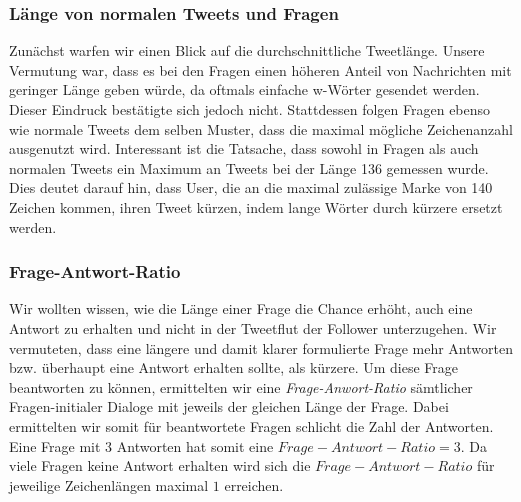 \documentclass[main.tex]{subfiles}
\begin{document}
\subsubsection{Länge von normalen Tweets und Fragen}

Zunächst warfen wir einen Blick auf die durchschnittliche Tweetlänge. Unsere Vermutung war, dass es bei den Fragen einen höheren Anteil von Nachrichten mit geringer Länge geben würde, da oftmals einfache w-Wörter gesendet werden. Dieser Eindruck bestätigte sich jedoch nicht. Stattdessen folgen Fragen ebenso wie normale Tweets dem selben Muster, dass die maximal mögliche Zeichenanzahl ausgenutzt wird. Interessant ist die Tatsache, dass sowohl in Fragen als auch normalen Tweets ein Maximum an Tweets bei der Länge 136 gemessen wurde. Dies deutet darauf hin, dass User, die an die maximal zulässige Marke von 140 Zeichen kommen, ihren Tweet kürzen, indem lange Wörter durch kürzere ersetzt werden.

\begin{center}
\end{center}

\subsubsection{Frage-Antwort-Ratio}

Wir wollten wissen, wie die Länge einer Frage die Chance erhöht, auch eine Antwort zu erhalten und nicht in der Tweetflut der Follower unterzugehen. Wir vermuteten, dass eine längere und damit klarer formulierte Frage mehr Antworten bzw. überhaupt eine Antwort erhalten sollte, als kürzere. Um diese Frage beantworten zu können, ermittelten wir eine \textit{Frage-Anwort-Ratio} sämtlicher Fragen-initialer Dialoge mit jeweils der gleichen Länge der Frage. Dabei ermittelten wir somit für beantwortete Fragen schlicht die Zahl der Antworten. Eine Frage mit 3 Antworten hat somit eine $Frage-Antwort-Ratio = 3$. Da viele Fragen keine Antwort erhalten wird sich die $Frage-Antwort-Ratio$ für jeweilige Zeichenlängen maximal $1$ erreichen.
\end{document}
